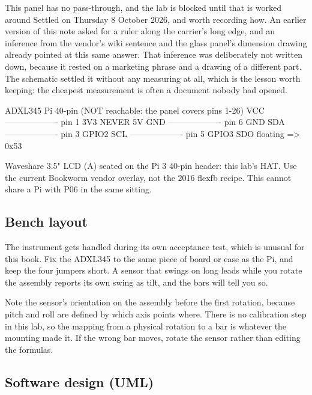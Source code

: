 \begin{note}{This panel has no pass-through, and the lab is blocked until that is worked around}
Settled on Thursday 8 October 2026, and worth recording how. An earlier version of this note asked for a ruler along the carrier's long edge, and an inference from the vendor's wiki sentence and the glass panel's dimension drawing already pointed at this same answer. That inference was deliberately not written down, because it rested on a marketing phrase and a drawing of a different part. The schematic settled it without any measuring at all, which is the lesson worth keeping: the cheapest measurement is often a document nobody had opened.
\end{note}

\begin{asciiart}
ADXL345                 Pi 40-pin (NOT reachable: the panel covers pins 1-26)
VCC ------------------- pin 1  3V3      NEVER 5V
GND ------------------- pin 6  GND
SDA ------------------- pin 3  GPIO2
SCL ------------------- pin 5  GPIO3
SDO floating => 0x53

Waveshare 3.5" LCD (A) seated on the Pi 3 40-pin header: this lab's HAT.
Use the current Bookworm vendor overlay, not the 2016 flexfb recipe.
This cannot share a Pi with P06 in the same sitting.
\end{asciiart}

\subsection*{Bench layout}


The instrument gets handled during its own acceptance test, which is unusual for this book. Fix the ADXL345 to the same piece of board or case as the Pi, and keep the four jumpers short. A sensor that swings on long leads while you rotate the assembly reports its own swing as tilt, and the bars will tell you so.

Note the sensor's orientation on the assembly before the first rotation, because pitch and roll are defined by which axis points where. There is no calibration step in this lab, so the mapping from a physical rotation to a bar is whatever the mounting made it. If the wrong bar moves, rotate the sensor rather than editing the formulas.

\subsection*{Software design (UML)}

